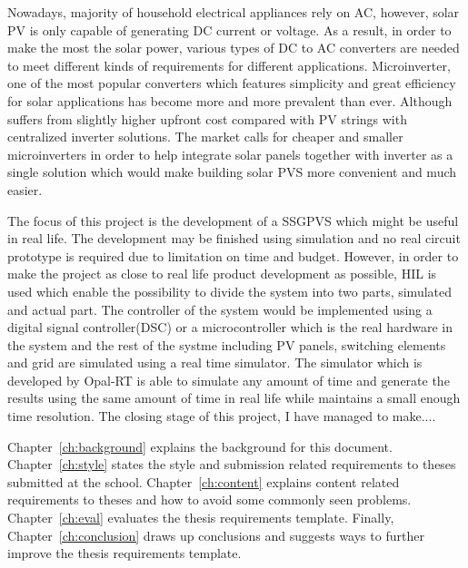 Nowadays, majority of household electrical appliances rely on \gls{AC}, however, solar \gls{PV} is only capable of generating \gls{DC} current or voltage. As a result, in order to make the most the solar power, various types of DC to AC converters are needed to meet different kinds of requirements for different applications. Microinverter, one of the most popular converters which features simplicity and great efficiency for solar applications has become more and more prevalent than ever. Although suffers from slightly higher upfront cost compared with PV strings with centralized inverter solutions. The market calls for cheaper and smaller microinverters in order to help integrate solar panels together with inverter as a single solution which would make building solar \gls{PVS} more convenient and much easier.

The focus of this project is the development of a \gls{SSGPVS} which might be useful in real life. The development may be finished using simulation and no real circuit prototype is required due to limitation on time and budget.  However, in order to make the project as close to real life product development as possible, \gls{HIL} is used which enable the possibility to divide the system into two parts, simulated and actual part. The controller of the system would be implemented using a digital signal controller(DSC) or a microcontroller which is the real hardware in the system and the rest of the systme including \gls{PV} panels, switching elements and grid are simulated using a real time simulator. The simulator which is developed by Opal-RT is able to simulate any amount of time and generate the results using the same amount of time in real life while maintains a small enough time resolution. The closing stage of this project, I have managed to make....



Chapter~\ref{ch:background} explains the background for this document.
Chapter~\ref{ch:style} states the style and submission related requirements
to theses submitted at the school.
Chapter~\ref{ch:content} explains content related requirements to theses and
how to avoid some commonly seen problems.
Chapter~\ref{ch:eval} evaluates the thesis requirements template.  Finally,
Chapter~\ref{ch:conclusion} draws up conclusions and suggests ways to
further improve the thesis requirements template.

